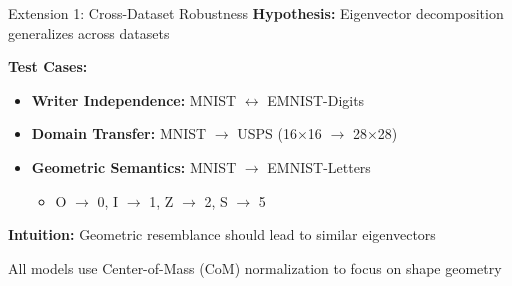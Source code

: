
\begin{frame}{Extension 1: Cross-Dataset Robustness}
    \textbf{Hypothesis:} Eigenvector decomposition generalizes across datasets
    
    \vspace{0.5cm}
    \textbf{Test Cases:}
    \begin{itemize}
        \item \textbf{Writer Independence:} MNIST $\leftrightarrow$ EMNIST-Digits
        \item \textbf{Domain Transfer:} MNIST $\rightarrow$ USPS (16$\times$16 $\to$ 28$\times$28)
        \item \textbf{Geometric Semantics:} MNIST $\rightarrow$ EMNIST-Letters
        \begin{itemize}
            \item O $\to$ 0, I $\to$ 1, Z $\to$ 2, S $\to$ 5
        \end{itemize}
    \end{itemize}
    
    \vspace{0.5cm}
    \textbf{Intuition:} Geometric resemblance should lead to similar eigenvectors
    
    \vspace{0.3cm}
    \small
    All models use Center-of-Mass (CoM) normalization to focus on shape geometry
\end{frame}

